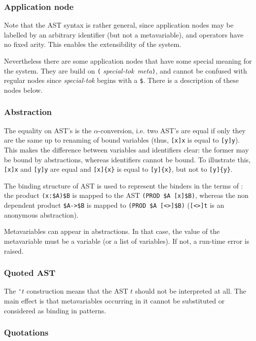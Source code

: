 {\subsubsection{Application node}

Note that the AST syntax is rather general, since application nodes
may be labelled by an arbitrary identifier (but not a metavariable),
and operators have no fixed arity. This enables the extensibility of
the system.

Nevertheless there are some application nodes that have some special
meaning for the system. They are build on \verb+(+{\sl
special-tok}~{\sl meta}\verb+)+, and cannot be confused with regular
nodes since {\sl special-tok} begins with a \verb+$+.
There is a description of these nodes below.

\subsubsection{Abstraction}

The equality on AST's is the $\alpha$-conversion, i.e. two AST's are
equal if only they are the same up to renaming of bound variables
(thus, \verb+[x]x+ is equal to \verb+[y]y+). This makes the difference
between variables and identifiers clear: the former may be bound by
abstractions, whereas identifiers cannot be bound. To illustrate this,
\verb+[x]x+ and \verb+[y]y+ are equal and \verb+[x]{x}+ is equal to
\verb+[y]{x}+, but not to \verb+[y]{y}+.

The binding structure of AST is used to represent the binders in the
terms of {\Coq}: the product \verb+(x:$A)$B+ is mapped to the AST
\verb+(PROD $A [x]$B)+, whereas the non dependent product
\verb+$A->$B+ is mapped to \verb+(PROD $A [<>]$B)+ (\verb+[<>]t+ is an
anonymous abstraction).

Metavariables can appear in abstractions. In that case, the value of
the metavariable must be a variable (or a list of variables). If not,
a run-time error is raised.

\subsubsection{Quoted AST}

The \verb+'+$t$ construction means that the AST $t$ should not be
interpreted at all. The main effect is that metavariables occurring in
it cannot be substituted or considered as binding in patterns.

\subsubsection{Quotations}

}
